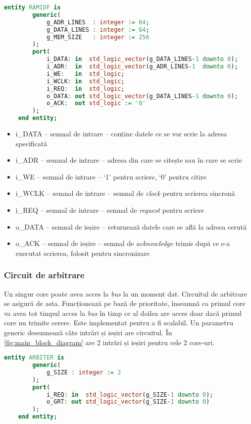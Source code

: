 \documentclass[../main.tex]{subfiles}
\begin{document}
\begin{lstlisting}[language=VHDL, caption={Entitatea memoriei RAM}, label={lst:ram}]
    entity RAM1DF is
        generic(
            g_ADR_LINES  : integer := 64;
            g_DATA_LINES : integer := 64;
            g_MEM_SIZE   : integer := 256
        );
        port(
            i_DATA: in  std_logic_vector(g_DATA_LINES-1 downto 0);
            i_ADR:  in  std_logic_vector(g_ADR_LINES-1  downto 0);
            i_WE:   in  std_logic;
            i_WCLK: in  std_logic;
            i_REQ:  in  std_logic;
            o_DATA: out std_logic_vector(g_DATA_LINES-1 downto 0);
            o_ACK:  out std_logic := '0'
        );
    end entity;
\end{lstlisting}

\begin{itemize}
    \item i\_DATA -- semnal de intrare -- conține datele ce se vor scrie la adresa specificată
    \item i\_ADR -- semnal de intrare -- adresa din care se citește sau în care se scrie
    \item i\_WE -- semnal de intrare -- `1' pentru scriere, `0' pentru citire
    \item i\_WCLK -- semnal de intrare -- semnal de \emph{clock} pentru scrierea sincronă
    \item i\_REQ -- semnal de intrare -- semnal de \emph{request} pentru scriere
    \item o\_DATA -- semnal de ieșire -- returnează datele care se află la adresa cerută
    \item o\_ACK -- semnal de ieșire -- semnal de \emph{acknowledge} trimis după ce s-a executat scrierea, folosit pentru sincronizare
\end{itemize}

\subsubsection{Circuit de arbitrare}
Un singur core poate avea acces la \emph{bus} la un moment dat. Circuitul de arbitrare se asigură de asta. Funcționează pe
bază de prioritate, înseamnă ca primul core va avea tot timpul acces la \emph{bus} în timp ce al doilea are acces doar dacă
primul core nu trimite cerere. Este implementat pentru a fi scalabil. Un parametru generic desemnează câte intrări și ieșiri
are circuitul. În \ref{fig:main_block_diagram} are 2 intrări și ieșiri pentru cele 2 core-uri.

\begin{lstlisting}[language=VHDL, caption={Entitatea arbitrului}, label={lst:arbiter}]
    entity ARBITER is
        generic(
            g_SIZE : integer := 2
        );
        port(
            i_REQ: in  std_logic_vector(g_SIZE-1 downto 0);
            o_GRT: out std_logic_vector(g_SIZE-1 downto 0)
        );
    end entity;
\end{lstlisting}
\end{document}
